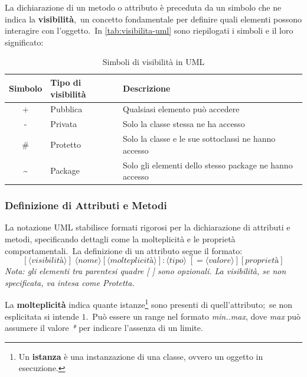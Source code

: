 La dichiarazione di un metodo o attributo è preceduta da un simbolo che ne indica la \textbf{visibilità},\
un concetto fondamentale per definire quali elementi possono interagire con l'oggetto.\
In \autoref{tab:visibilita-uml} sono riepilogati i simboli e il loro significato:\

\begin{table}[h!]
    \centering
    \caption{Simboli di visibilità in UML}
    \label{tab:visibilita-uml}
    \begin{tabular}{c l p{8cm}}
        \toprule
        \textbf{Simbolo} & \textbf{Tipo di visibilità} & \textbf{Descrizione}                                    \\
        \midrule
        +                & Pubblica                    & Qualsiasi elemento può accedere                         \\
        -                & Privata                     & Solo la classe stessa ne ha accesso                     \\
        \#               & Protetto                    & Solo la classe e le sue sottoclassi ne hanno accesso    \\
        \textasciitilde  & Package                     & Solo gli elementi dello stesso package ne hanno accesso \\
        \bottomrule
    \end{tabular}
\end{table}

\subsubsection{Definizione di Attributi e Metodi}

La notazione UML stabilisce formati rigorosi per la dichiarazione di attributi e metodi, specificando dettagli come la molteplicità e le proprietà comportamentali.\
La definizione di un attributo segue il formato:
\[
    [\langle \textit{visibilità} \rangle] \;
    \langle \textit{nome} \rangle [\langle \textit{molteplicità} \rangle]: \langle \textit{tipo} \rangle \;
    [= \langle \textit{valore} \rangle][{\textit{proprietà}}]
\]
\textit{Nota: gli elementi tra parentesi quadre [ ] sono opzionali. La visibilità, se non specificata, va intesa come Protetta.}

La \textbf{molteplicità} indica quante istanze\footnote{Un \textbf{istanza} è una instanzazione di una classe, ovvero un oggetto in esecuzione.} sono presenti di quell'attributo;\
se non esplicitata si intende $1$.\
Può essere un range nel formato \textit{min..max}, dove \textit{max} può assumere il valore \textit{*} per indicare l'assenza di un limite.

